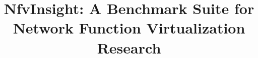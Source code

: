 \documentclass{sig-alternate-10pt}
\begin{document}






%


\title{NfvInsight: A Benchmark Suite for Network Function Virtualization Research}

%
%
%
%
%
\end{document}
